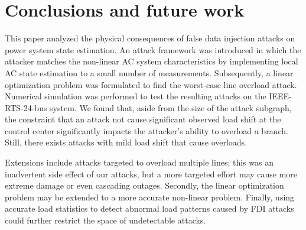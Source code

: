 \documentclass[twocolumn,english,final,journal]{IEEEtran}
\theoremstyle{plain}
\theoremstyle{definition}
\begin{document}
\section{Conclusions and future work \label{sec:Conclusions-and-future}}

This paper analyzed the physical consequences of false data injection attacks on power system state estimation. An attack framework was introduced in which the attacker matches the non-linear AC system characteristics by implementing local AC state estimation to a small number of measurements. Subsequently, a linear optimization problem was formulated to find the worst-case line overload attack. Numerical simulation was performed to test the resulting attacks on the IEEE-RTS-24-bus system. We found that, aside from the size of the attack subgraph, the constraint that an attack not cause significant observed load shift at the control center significantly impacts the attacker's ability to overload a branch. Still, there exists attacks with mild load shift that cause overloads.

Extensions include attacks targeted to overload multiple lines; this was an inadvertent side effect of our attacks, but a more targeted effort may cause more extreme damage or even cascading outages. Secondly, the linear optimization problem may be extended to a more accurate non-linear problem. Finally, using accurate load statistics to detect abnormal load patterns caused by FDI attacks could further restrict the space of undetectable attacks.



\end{document}
